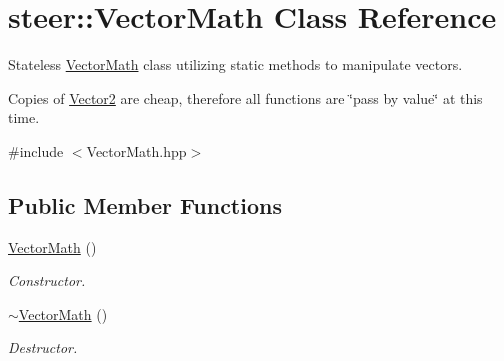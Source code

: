\hypertarget{classsteer_1_1_vector_math}{\section{steer\-:\-:Vector\-Math Class Reference}
\label{classsteer_1_1_vector_math}
}


Stateless \hyperlink{classsteer_1_1_vector_math}{Vector\-Math} class utilizing static methods to manipulate vectors. \par
Copies of \hyperlink{structsteer_1_1_vector2}{Vector2} are cheap, therefore all functions are \char`\"{}pass by value\char`\"{} at this time.  




{\ttfamily \#include $<$Vector\-Math.\-hpp$>$}

\subsection*{Public Member Functions}
\begin{DoxyCompactItemize}
\item 
\hypertarget{classsteer_1_1_vector_math_afa46a599077253d47819d92e0be8d383}{\hyperlink{classsteer_1_1_vector_math_afa46a599077253d47819d92e0be8d383}{Vector\-Math} ()}\label{classsteer_1_1_vector_math_afa46a599077253d47819d92e0be8d383}

\begin{DoxyCompactList}\small\item\em Constructor. \end{DoxyCompactList}\item 
\hypertarget{classsteer_1_1_vector_math_a311193142786d1f4904dd6de3146b474}{\hyperlink{classsteer_1_1_vector_math_a311193142786d1f4904dd6de3146b474}{$\sim$\-Vector\-Math} ()}\label{classsteer_1_1_vector_math_a311193142786d1f4904dd6de3146b474}

\begin{DoxyCompactList}\small\item\em Destructor. \end{DoxyCompactList}\end{DoxyCompactItemize}
